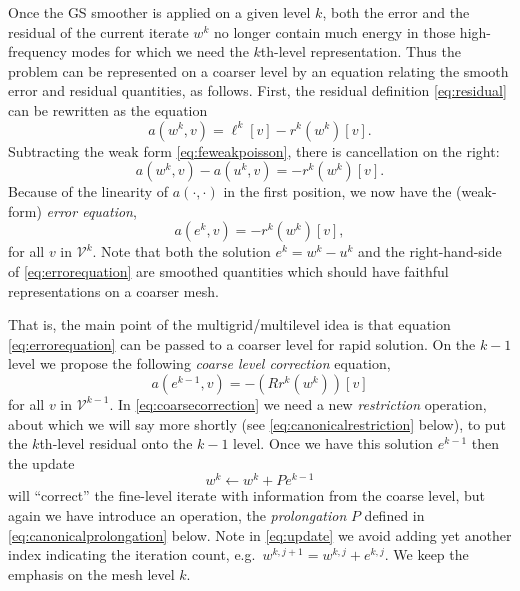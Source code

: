 \documentclass[letterpaper,final,12pt,reqno]{amsart}
\begin{document}
Once the GS smoother is applied on a given level $k$, both the error and the residual of the current iterate $w^k$ no longer contain much energy in those high-frequency modes for which we need the $k$th-level representation.  Thus the problem can be represented on a coarser level by an equation relating the smooth error and residual quantities, as follows.  First, the residual definition \eqref{eq:residual} can be rewritten as the equation
\begin{equation}
  a(w^k,v) = \ell^k[v] - r^k(w^k)[v].  \label{eq:residualrewrite}
\end{equation}
Subtracting the weak form \eqref{eq:feweakpoisson}, there is cancellation on the right:
\begin{equation}
  a(w^k,v) - a(u^k,v) = - r^k(w^k)[v].  \label{eq:errorequationearly}
\end{equation}
Because of the linearity of $a(\cdot,\cdot)$ in the first position, we now have the (weak-form) \emph{error equation},
\begin{equation}
  a(e^k,v) = - r^k(w^k)[v],  \label{eq:errorequation}
\end{equation}
for all $v$ in $\mathcal{V}^k$.  Note that both the solution $e^k=w^k-u^k$ and the right-hand-side of \eqref{eq:errorequation} are smoothed quantities which should have faithful representations on a coarser mesh.

That is, the main point of the multigrid/multilevel idea is that equation \eqref{eq:errorequation} can be passed to a coarser level for rapid solution.  On the $k-1$ level we propose the following \emph{coarse level correction}  equation,
\begin{equation}
  a(e^{k-1},v) = - (Rr^k(w^k))[v]  \label{eq:coarsecorrection}
\end{equation}
for all $v$ in $\mathcal{V}^{k-1}$.  In \eqref{eq:coarsecorrection} we need a new \emph{restriction} operation, about which we will say more shortly (see \eqref{eq:canonicalrestriction} below), to put the $k$th-level residual onto the $k-1$ level.  Once we have this solution $e^{k-1}$ then the update
\begin{equation}
  w^k \gets w^k + P e^{k-1}  \label{eq:update}
\end{equation}
will ``correct'' the fine-level iterate with information from the coarse level, but again we have introduce an operation, the \emph{prolongation} $P$ defined in \eqref{eq:canonicalprolongation} below.  Note in \eqref{eq:update} we avoid adding yet another index indicating the iteration count, e.g.~$w^{k,j+1} = w^{k,j} + e^{k,j}$.  We keep the emphasis on the mesh level $k$.
\end{document}
